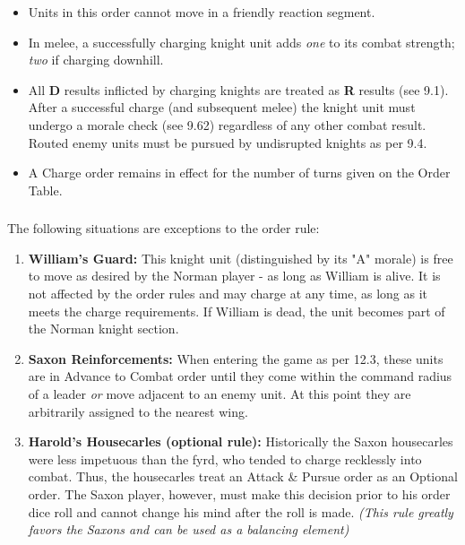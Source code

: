 \begin{itemize}
  \item Units in this order cannot move in a friendly reaction segment.
  \item In melee, a successfully charging knight unit adds \textit{one} to its combat strength; \textit{two} if charging downhill.
  \item All \textbf{D} results inflicted by charging knights are treated as \textbf{R} results (see 9.1). After a successful charge (and subsequent melee) the knight unit must undergo a morale check (see 9.62) regardless of any other combat result. Routed enemy units must be pursued by undisrupted knights as per 9.4.
  \item A Charge order remains in effect for the number of turns given on the Order Table.
\end{itemize}

\subsubsection[Exceptions to Order Rules]{} The following situations are exceptions to the order rule:

\begin{enumerate}
  \item \textbf{William's Guard:} This knight unit (distinguished by its "A" morale) is free to move as desired by the Norman player - as long as William is alive. It is not affected by the order rules and may charge at any time, as long as it meets the charge requirements. If William is dead, the unit becomes part of the Norman knight section.
  \item \textbf{Saxon Reinforcements:} When entering the game as per 12.3, these units are in Advance to Combat order until they come within the command radius of a leader \textit{or} move adjacent to an enemy unit. At this point they are arbitrarily assigned to the nearest wing.
  \item \textbf{Harold's Housecarles (optional rule):} Historically the Saxon housecarles were less impetuous than the fyrd, who tended to charge recklessly into combat. Thus, the housecarles treat an Attack \& Pursue order as an Optional order. The Saxon player, however, must make this decision prior to his order dice roll and cannot change his mind after the roll is made. \textit{(This rule greatly favors the Saxons and can be used as a balancing element)}
\end{enumerate}